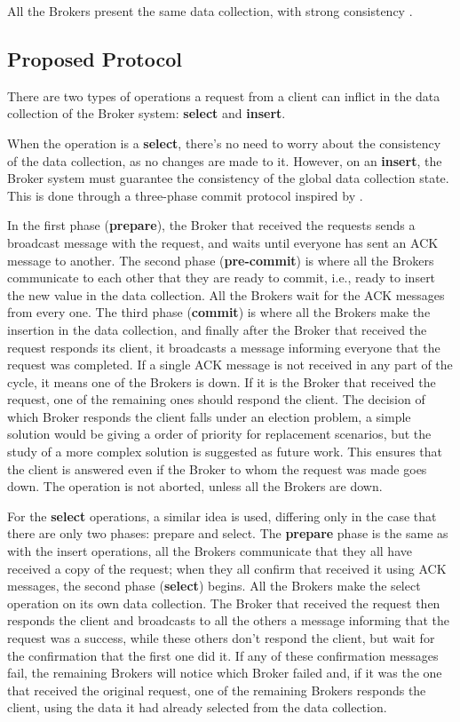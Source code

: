 All the Brokers present the same data collection, with strong consistency \cite{vogels2009eventually}. 


\subsection{Proposed Protocol}

There are two types of operations a request from a client can inflict in the data collection of the Broker system: \textbf{select} and \textbf{insert}.

When the operation is a \textbf{select}, there's no need to worry about the consistency of the data collection, as no changes are made to it. However, on an \textbf{insert}, the Broker system must guarantee the consistency of the global data collection state. This is done through a three-phase commit protocol inspired by \cite{guerraoui2002non}.


In the first phase (\textbf{prepare}), the Broker that received the requests sends a broadcast message with the request, and waits until everyone has sent an ACK message to another. The second phase (\textbf{pre-commit}) is where all the Brokers communicate to each other that they are ready to commit, i.e., ready to insert the new value in the data collection. All the Brokers wait for the ACK messages from every one. The third phase (\textbf{commit}) is where all the Brokers make the insertion in the data collection, and finally after the Broker that received the request responds its client, it broadcasts a message informing everyone that the request was completed. If a single ACK message is not received in any part of the cycle, it means one of the Brokers is down. If it is the Broker that received the request, one of the remaining ones should respond the client. The decision of which Broker responds the client falls under an election problem, a simple solution would be giving a order of priority for replacement scenarios, but the study of a more complex solution is suggested as future work. This ensures that the client is answered even if the Broker to whom the request was made goes down. The operation is not aborted, unless all the Brokers are down.


For the \textbf{select} operations, a similar idea is used, differing only in the case that there are only two phases: prepare and select. The \textbf{prepare} phase is the same as with the insert operations, all the Brokers communicate that they all have received a copy of the request; when they all confirm that received it using ACK messages, the second phase (\textbf{select}) begins. All the Brokers make the select operation on its own data collection. The Broker that received the request then responds the client and broadcasts to all the others a message informing that the request was a success, while these others don't respond the client, but wait for the confirmation that the first one did it. If any of these confirmation messages fail, the remaining Brokers will notice which Broker failed and, if it was the one that received the original request, one of the remaining Brokers responds the client, using the data it had already selected from the data collection.

